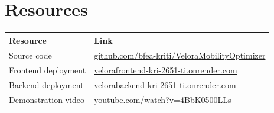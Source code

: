 \documentclass[11pt,a4paper]{article}
\begin{document}
\section{Resources}

\begin{center}\small
\begin{tabularx}{0.94\textwidth}{@{}p{}X@{}}
\toprule
\rowcolor{tblhead}\textbf{Resource} & \textbf{Link} \\
\midrule
\rowcolor{rowalt}Source code &
\href{https://github.com/bfea-kriti/VeloraMobilityOptimizer}{github.com/bfea-kriti/VeloraMobilityOptimizer} \\
Frontend deployment &
\href{https://velorafrontend-kri-2651-ti.onrender.com}{velorafrontend-kri-2651-ti.onrender.com} \\
\rowcolor{rowalt}Backend deployment &
\href{https://velorabackend-kri-2651-ti.onrender.com}{velorabackend-kri-2651-ti.onrender.com} \\
Demonstration video &
\href{https://www.youtube.com/watch?v=4BbK0500LLs}{youtube.com/watch?v=4BbK0500LLs} \\
\bottomrule
\end{tabularx}
\end{center}

\FloatBarrier
{}
{}


\end{document}
